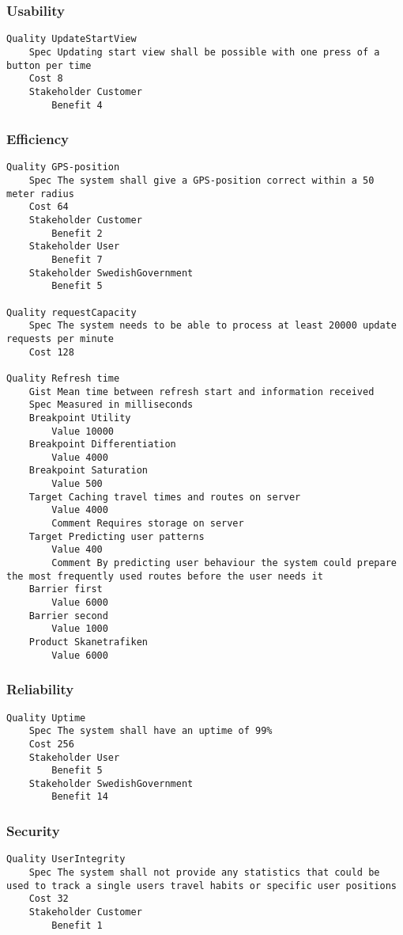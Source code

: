 \begin{lstlisting}

\end{lstlisting}


			 \subsubsection{Usability}


\begin{lstlisting}
Quality UpdateStartView
	Spec Updating start view shall be possible with one press of a button per time
	Cost 8
	Stakeholder Customer
		Benefit 4

\end{lstlisting}
		
				
			 \subsubsection{Efficiency}


\begin{lstlisting}
Quality GPS-position
	Spec The system shall give a GPS-position correct within a 50 meter radius
	Cost 64
	Stakeholder Customer
		Benefit 2
	Stakeholder User
		Benefit 7
	Stakeholder SwedishGovernment
		Benefit 5

Quality requestCapacity
	Spec The system needs to be able to process at least 20000 update requests per minute
	Cost 128

Quality Refresh time
	Gist Mean time between refresh start and information received
	Spec Measured in milliseconds
	Breakpoint Utility
		Value 10000
	Breakpoint Differentiation
		Value 4000
	Breakpoint Saturation
		Value 500
	Target Caching travel times and routes on server
		Value 4000
		Comment Requires storage on server
	Target Predicting user patterns
		Value 400
		Comment By predicting user behaviour the system could prepare the most frequently used routes before the user needs it
	Barrier first
		Value 6000
	Barrier second
		Value 1000
	Product Skanetrafiken
		Value 6000

\end{lstlisting}
		
				
			 \subsubsection{Reliability}


\begin{lstlisting}
Quality Uptime
	Spec The system shall have an uptime of 99%
	Cost 256
	Stakeholder User
		Benefit 5
	Stakeholder SwedishGovernment
		Benefit 14

\end{lstlisting}
		
				
			 \subsubsection{Security}


\begin{lstlisting}
Quality UserIntegrity
	Spec The system shall not provide any statistics that could be used to track a single users travel habits or specific user positions
	Cost 32
	Stakeholder Customer
		Benefit 1

\end{lstlisting}
